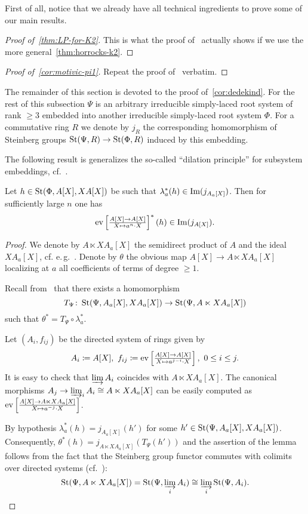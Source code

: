 First of all, notice that we already have all technical ingredients to prove
 some of our main results.

\begin{proof}[Proof of~\cref{thm:LP-for-K2}]
    This is what the proof of~\cite[Theorem~1.1]{LSV2} actually shows if we use the more general~\cref{thm:horrocks-k2}.
\end{proof}

\begin{proof}[Proof of~\cref{cor:motivic-pi1}]
    Repeat the proof of~\cite[Corollary~1.2]{LSV2} verbatim.
\end{proof}

The remainder of this section is devoted to the proof of~\cref{cor:dedekind}.
For the rest of this subsection $\Psi$ is an arbitrary irreducible simply-laced root system of rank $\geq 3$ embedded into another irreducible simply-laced root system $\Phi$.
For a commutative ring $R$ we denote by $j_R$ the corresponding homomorphism of Steinberg groups $\operatorname{St}(\Psi, R) \to \operatorname{St}(\Phi, R)$ induced by this embedding.

The following result is generalizes the so-called ``dilation principle'' for subsystem embeddings, cf.~\cite[Corollary~2.4]{Tu83}.
\begin{lemma}\label{lem:dp-2}
Let $h\in\operatorname{St}(\Phi, A[X], X A[X])$ be such that $\lambda_a^*(h) \in \operatorname{Im}(j_{A_a[X]})$.
Then for sufficiently large $n$ one has
\[\mathrm{ev} \textstyle \left[\frac{A[X] \rightarrow A[X]}{X \mapsto a^n\cdot X}\right]^*(h) \in \mathrm{Im}(j_{A[X]}).\]
\end{lemma}
\begin{proof}
 We denote by $A\ltimes XA_a[X]$ the semidirect product of $A$ and the ideal $XA_a[X]$, cf. e.\,g.~\cite[Definition~3.2]{S15}.
 Denote by $\theta$ the obvious map $A[X]\rightarrow A\ltimes XA_a[X]$ localizing at $a$ all coefficients of terms of degree $\geq 1$.

 Recall from~\cite[\S~2]{LS17} that there exists a homomorphism
 \[T_\Psi \colon \operatorname{St}(\Psi, A_a[X], XA_a[X]) \to \operatorname{St}(\Psi, A \ltimes XA_a[X])\]
 such that $\theta^* = T_\Psi \circ \lambda_a^*$.

 Let $(A_i, f_{ij})$ be the directed system of rings given by
 \[A_i\coloneqq A[X],\ f_{ij} \coloneqq \mathrm{ev} \textstyle \left[\frac{A[X] \rightarrow A[X]}{X \mapsto a^{j-i} \cdot X}\right],\ 0 \leq i\leq j.\]
 It is easy to check that $\varinjlim A_i$ coincides with $A \ltimes XA_a[X]$.
 The canonical morphisms $A_j\rightarrow \varinjlim_i A_i \cong A \ltimes XA_a[X]$ can be easily computed as $\mathrm{ev} \textstyle \left[\frac{A[X] \rightarrow A\ltimes XA_a[X]}{X \mapsto a^{-j} \cdot X}\right]$.

 By hypothesis $\lambda_a^*(h) = j_{A_a[X]}(h')$ for some $h' \in \operatorname{St}(\Psi, A_a[X], XA_a[X])$.
 Consequently, $\theta^*(h) = j_{A \ltimes XA_a[X]}(T_\Psi(h'))$
 and the assertion of the lemma follows from the fact that the Steinberg group functor commutes with
  colimits over directed systems (cf.~\cite[Lemma~2.2]{Tu83}):
 \[\operatorname{St}(\Psi, A\ltimes XA_a[X]) = \operatorname{St}(\Psi, \varinjlim_i A_i) \cong \varinjlim_i \operatorname{St}(\Psi,A_i). \qedhere\]
\end{proof}

